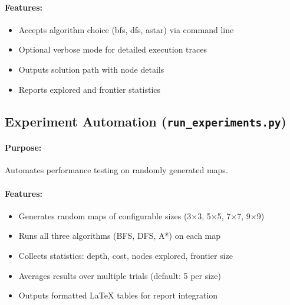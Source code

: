 \documentclass[11pt,a4paper]{article}
\begin{document}
\paragraph{Features:}
\begin{itemize}[leftmargin=1.5cm,itemsep=0.1em]
    \item Accepts algorithm choice (bfs, dfs, astar) via command line
    \item Optional verbose mode for detailed execution traces
    \item Outputs solution path with node details
    \item Reports explored and frontier statistics
\end{itemize}

\subsection{Experiment Automation (\texttt{run\_experiments.py})}

\paragraph{Purpose:} Automates performance testing on randomly generated maps.

\paragraph{Features:}
\begin{itemize}[leftmargin=1.5cm,itemsep=0.1em]
    \item Generates random maps of configurable sizes (3$\times$3, 5$\times$5, 7$\times$7, 9$\times$9)
    \item Runs all three algorithms (BFS, DFS, A*) on each map
    \item Collects statistics: depth, cost, nodes explored, frontier size
    \item Averages results over multiple trials (default: 5 per size)
    \item Outputs formatted LaTeX tables for report integration
\end{itemize}
\end{document}
